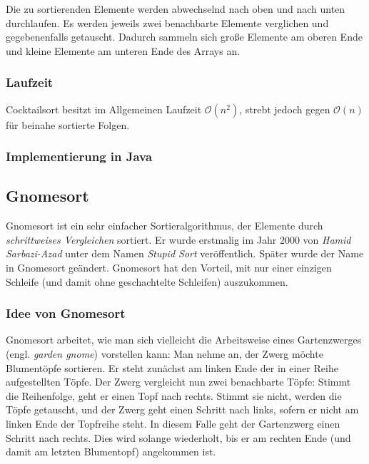 \documentclass[german]{pfBook}
\newcommand{\OO}{\mathcal{O}}
\begin{document}
	Die zu sortierenden Elemente werden abwechselnd nach oben und nach unten durchlaufen. Es werden jeweils zwei benachbarte Elemente verglichen und gegebenenfalls getauscht. Dadurch sammeln sich große Elemente am oberen Ende und kleine Elemente am unteren Ende des Arrays an.
	
	\subsubsection{Laufzeit}
	
	Cocktailsort besitzt im Allgemeinen Laufzeit $\OO(n^2)$, strebt jedoch gegen $\OO(n)$ für beinahe sortierte Folgen.
	
	\subsubsection{Implementierung in Java}
	
	
	
	\subsection{Gnomesort}
	
	Gnomesort ist ein sehr einfacher Sortieralgorithmus, der Elemente durch \emph{schrittweises Vergleichen} sortiert. Er wurde erstmalig im Jahr 2000 von \emph{Hamid Sarbazi-Azad} unter dem Namen \emph{Stupid Sort} veröffentlich. Später wurde der Name in Gnomesort geändert. Gnomesort hat den Vorteil, mit nur einer einzigen Schleife (und damit ohne geschachtelte Schleifen) auszukommen.
	
	\subsubsection{Idee von Gnomesort}
	
	Gnomesort arbeitet, wie man sich vielleicht die Arbeitsweise eines Gartenzwerges (engl. \emph{garden gnome}) vorstellen kann: Man nehme an, der Zwerg möchte Blumentöpfe sortieren. Er steht zunächst am linken Ende der in einer Reihe aufgestellten Töpfe. Der Zwerg vergleicht nun zwei benachbarte Töpfe: Stimmt die Reihenfolge, geht er einen Topf nach rechts. Stimmt sie nicht, werden die Töpfe getauscht, und der Zwerg geht einen Schritt nach links, sofern er nicht am linken Ende der Topfreihe steht. In diesem Falle geht der Gartenzwerg einen Schritt nach rechts. Dies wird solange wiederholt, bis er am rechten Ende (und damit am letzten Blumentopf) angekommen ist.
	
\end{document}
